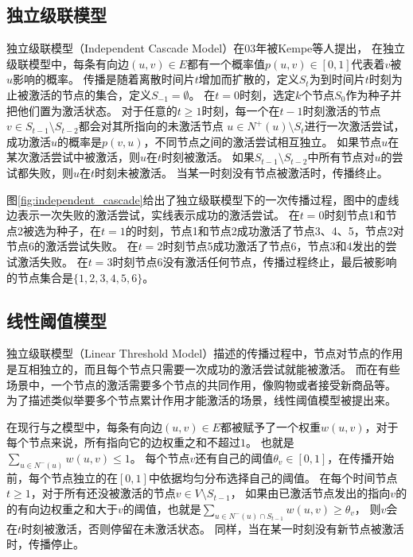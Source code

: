 \subsection{独立级联模型}
独立级联模型（Independent Cascade Model）在03年被Kempe等人\cite{Kempe2003maximizing}提出，
在独立级联模型中，每条有向边$(u,v) \in E$都有一个概率值$p(u,v) \in [0,1]$代表着$v$被$u$影响的概率。
传播是随着离散时间片$t$增加而扩散的，定义$S_t$为到时间片$t$时刻为止被激活的节点的集合，定义$S_{-1}=\emptyset$。
在$t=0$时刻，选定$k$个节点$S_0$作为种子并把他们置为激活状态。
对于任意的$t\geq 1$时刻，每一个在$t-1$时刻激活的节点$v \in S_{t-1} \setminus S_{t-2}$都会对其所指向的未激活节点
$u \in N^+(u) \setminus S_{t}$进行一次激活尝试，成功激活$u$的概率是$p(v,u)$，不同节点之间的激活尝试相互独立。
如果节点$u$在某次激活尝试中被激活，则$u$在$t$时刻被激活。
如果$S_{t-1} \setminus S_{t-2}$中所有节点对$u$的尝试都失败，则$u$在$t$时刻未被激活。
当某一时刻没有节点被激活时，传播终止。

图\ref{fig:independent_cascade}给出了独立级联模型下的一次传播过程，图中的虚线边表示一次失败的激活尝试，实线表示成功的激活尝试。
在$t=0$时刻节点1和节点2被选为种子，在$t=1$的时刻，节点1和节点2成功激活了节点3、4、5，节点2对节点6的激活尝试失败。
在$t=2$时刻节点5成功激活了节点6，节点3和4发出的尝试激活失败。
在$t=3$时刻节点6没有激活任何节点，传播过程终止，最后被影响的节点集合是$\{1,2,3,4,5,6\}$。

\subsection{线性阈值模型}
独立级联模型（Linear Threshold Model）\cite{Kempe2003maximizing}描述的传播过程中，节点对节点的作用是互相独立的，而且每个节点只需要一次成功的激活尝试就能被激活。
而在有些场景中，一个节点的激活需要多个节点的共同作用，像购物或者接受新商品等。
为了描述类似举要多个节点累计作用才能激活的场景，线性阈值模型被提出来。

在现行与之模型中，每条有向边$(u,v) \in E$都被赋予了一个权重$w(u,v)$，对于每个节点来说，所有指向它的边权重之和不超过$1$。
也就是$\sum_{u \in N^-(u)} w(u,v) \leq 1$。
每个节点$v$还有自己的阈值$\theta_v \in [0,1]$，在传播开始前，每个节点独立的在$[0,1]$中依据均匀分布选择自己的阈值。
在每个时间节点$t \geq 1$，对于所有还没被激活的节点$v \in V \setminus S_{t-1}$，
如果由已激活节点发出的指向$v$的的有向边权重之和大于$v$的阈值，也就是$\sum_{u \in N^-(u) \cap S_{t-1}} w(u,v) \geq \theta_v$，
则$v$会在$t$时刻被激活，否则停留在未激活状态。
同样，当在某一时刻没有新节点被激活时，传播停止。


